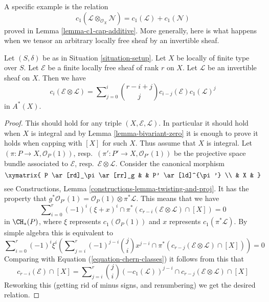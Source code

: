 \medskip\noindent
A specific example is the relation
$$
c_1(\mathcal{L} \otimes_{\mathcal{O}_X} \mathcal{N})
=
c_1(\mathcal{L}) + c_1(\mathcal{N})
$$
proved in Lemma \ref{lemma-c1-cap-additive}.
More generally, here is what happens when we tensor an
arbitrary locally free sheaf by an invertible sheaf.

\begin{lemma}
\label{lemma-chern-classes-E-tensor-L}
Let $(S, \delta)$ be as in Situation \ref{situation-setup}.
Let $X$ be locally of finite type over $S$.
Let $\mathcal{E}$ be a finite locally free sheaf of
rank $r$ on $X$. Let $\mathcal{L}$ be an invertible
sheaf on $X$. Then we have
\begin{equation}
\label{equation-twist}
c_i({\mathcal E} \otimes {\mathcal L})
=
\sum\nolimits_{j = 0}^i
\binom{r - i + j}{j} c_{i - j}({\mathcal E}) c_1({\mathcal L})^j
\end{equation}
in $A^*(X)$.
\end{lemma}

\begin{proof}
This should hold for any triple $(X, \mathcal{E}, \mathcal{L})$.
In particular it should hold when $X$ is integral and by
Lemma \ref{lemma-bivariant-zero}
it is enough to prove
it holds when capping with $[X]$ for such $X$. Thus assume
that $X$ is integral. Let $(\pi : P \to X, \mathcal{O}_P(1))$,
resp.\ $(\pi' : P' \to X, \mathcal{O}_{P'}(1))$ be the
projective space bundle associated to $\mathcal{E}$,
resp.\ $\mathcal{E} \otimes \mathcal{L}$. Consider the canonical morphism
$$
\xymatrix{
P \ar[rd]_\pi \ar[rr]_g & & P' \ar[ld]^{\pi'} \\
& X &
}
$$
see Constructions, Lemma \ref{constructions-lemma-twisting-and-proj}.
It has the property that
$g^*\mathcal{O}_{P'}(1)
= \mathcal{O}_P(1) \otimes \pi^* {\mathcal L}$.
This means that we have
$$
\sum\nolimits_{i = 0}^r
(-1)^i
(\xi + x)^i \cap \pi^*(c_{r - i}(\mathcal{E} \otimes \mathcal{L}) \cap [X])
=
0
$$
in $\CH_*(P)$, where $\xi$ represents
$c_1(\mathcal{O}_P(1))$ and $x$
represents $c_1(\pi^*\mathcal{L})$. By simple algebra this
is equivalent to
$$
\sum\nolimits_{i = 0}^r
(-1)^i \xi^i \left(
\sum\nolimits_{j = i}^r
(-1)^{j - i}
\binom{j}{i}
x^{j - i} \cap
\pi^*(c_{r - j}(\mathcal{E} \otimes \mathcal{L}) \cap [X])
\right)
=
0
$$
Comparing with
Equation (\ref{equation-chern-classes}) it follows from this that
$$
c_{r - i}(\mathcal{E}) \cap [X] =
\sum\nolimits_{j = i}^r
\binom{j}{i}
(-c_1(\mathcal{L}))^{j - i} \cap
c_{r - j}(\mathcal{E} \otimes \mathcal{L}) \cap [X]
$$
Reworking this (getting rid of minus signs, and renumbering) we get
the desired relation.
\end{proof}

